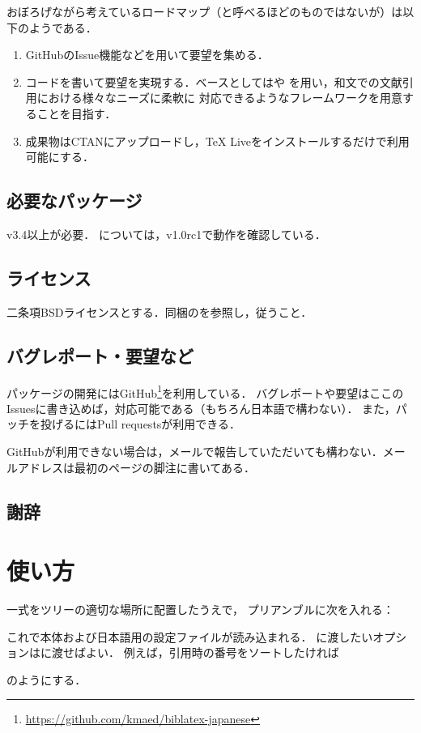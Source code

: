 \documentclass{jlreq}
\begin{document}
おぼろげながら考えているロードマップ（と呼べるほどのものではないが）は以下のようである．
\begin{enumerate}
\item GitHubのIssue機能などを用いて要望を集める．
\item コードを書いて要望を実現する．ベースとしてはや
  を用い，和文での文献引用における様々なニーズに柔軟に
  対応できるようなフレームワークを用意することを目指す．
\item 成果物はCTANにアップロードし，\TeX{} Liveをインストールするだけで利用可能にする．
\end{enumerate}

\subsection{必要なパッケージ}
 v3.4以上が必要．
については，v1.0rc1で動作を確認している．

\subsection{ライセンス}
二条項BSDライセンスとする．同梱のを参照し，従うこと．

\subsection{バグレポート・要望など}
パッケージの開発にはGitHub\footnote{\url{https://github.com/kmaed/biblatex-japanese}}を利用している．
バグレポートや要望はここのIssuesに書き込めば，対応可能である（もちろん日本語で構わない）．
また，パッチを投げるにはPull requestsが利用できる．

GitHubが利用できない場合は，メールで報告していただいても構わない．メールアドレスは最初のページの脚注に書いてある．

\subsection{謝辞}


\section{使い方}
一式をツリーの適切な場所に配置したうえで，
プリアンブルに次を入れる：
\begin{ltxexample}
\usepackage[backend=biber]{biblatex-japanese}
\end{ltxexample}
これで本体および日本語用の設定ファイルが読み込まれる．
に渡したいオプションはに渡せばよい．
例えば，引用時の番号をソートしたければ
\begin{ltxexample}
\usepackage[backend=biber,sortcites=true]{biblatex-japanese}
\end{ltxexample}
のようにする．
\end{document}
